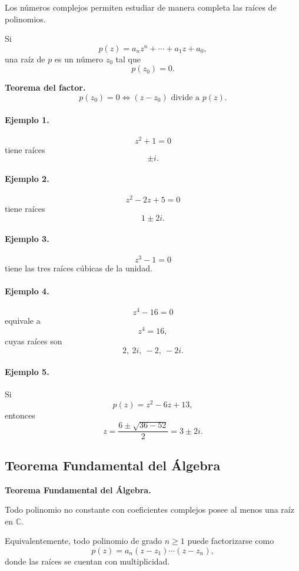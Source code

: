 Los números complejos permiten estudiar de manera completa las raíces de
polinomios.

Si
\[
p(z)=a_nz^n+\cdots+a_1z+a_0,
\]
una raíz de $p$ es un número $z_0$ tal que
\[
p(z_0)=0.
\]

\textbf{Teorema del factor.}
\[
p(z_0)=0
\iff
(z-z_0)\text{ divide a }p(z).
\]

\paragraph{Ejemplo 1.}
\[
z^2+1=0
\]
tiene raíces
\[
\pm i.
\]

\paragraph{Ejemplo 2.}
\[
z^2-2z+5=0
\]
tiene raíces
\[
1\pm2i.
\]

\paragraph{Ejemplo 3.}
\[
z^3-1=0
\]
tiene las tres raíces cúbicas de la unidad.

\paragraph{Ejemplo 4.}
\[
z^4-16=0
\]
equivale a
\[
z^4=16,
\]
cuyas raíces son
\[
2,\ 2i,\ -2,\ -2i.
\]

\paragraph{Ejemplo 5.}
Si
\[
p(z)=z^2-6z+13,
\]
entonces
\[
z
=
\frac{6\pm\sqrt{36-52}}{2}
=
3\pm2i.
\]

\subsection{Teorema Fundamental del Álgebra}

\textbf{Teorema Fundamental del Álgebra.}

Todo polinomio no constante con coeficientes complejos posee al menos una raíz
en $\mathbb{C}$.

Equivalentemente, todo polinomio de grado $n\geq1$ puede factorizarse como
\[
\boxed{
p(z)
=
a_n
(z-z_1)\cdots(z-z_n),
}
\]
donde las raíces se cuentan con multiplicidad.

